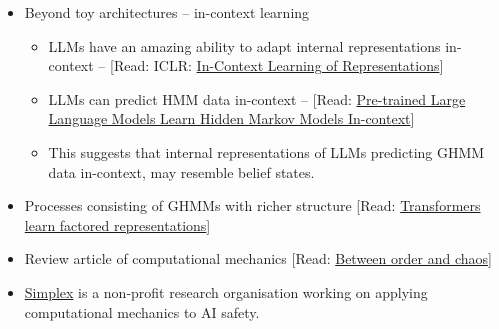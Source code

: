 \documentclass[11pt]{article}
\begin{document}
\begin{itemize}
\item
  Beyond toy architectures -- in-context learning
  \begin{itemize}
  \item
    LLMs have an amazing ability to adapt internal representations in-context -- {[}Read: ICLR: \href{https://arxiv.org/pdf/2501.00070}{In-Context Learning of Representations}{]}
  \item
    LLMs can predict HMM data in-context -- {[}Read: \href{https://arxiv.org/pdf/2506.07298}{Pre-trained Large Language Models Learn Hidden Markov Models In-context}{]}
  \item
    This suggests that internal representations of LLMs predicting GHMM data in-context, may resemble belief states.
  \end{itemize}
\item
  Processes consisting of GHMMs with richer structure {[}Read: \href{https://arxiv.org/pdf/2602.02385v1}{Transformers learn factored representations}{]}
\item
  Review article of computational mechanics {[}Read: \href{https://www.nature.com/articles/nphys2190}{Between order and chaos}{]}
\item
  \href{https://www.simplexaisafety.com/}{Simplex} is a non-profit research organisation working on applying computational mechanics to AI safety.
\end{itemize}
\end{document}
